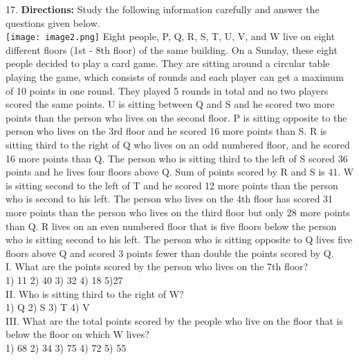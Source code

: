 \documentclass[
]{article}
\begin{document}
17. \textbf{Directions:} Study the following information carefully and answer the questions given
below.\\
\texttt{[image: image2.png]}
Eight people, P, Q, R, S, T, U, V, and W live on eight different floors (1st - 8th floor) of the
same building. On a Sunday, these eight people decided to play a card game. They are
sitting around a circular table playing the game, which consists of rounds and each player
can get a maximum of 10 points in one round. They played 5 rounds in total and no two
players scored the same points.
U is sitting between Q and S and he scored two more points than the person who lives on
the second floor. P is sitting opposite to the person who lives on the 3rd floor and he scored
16 more points than S. R is sitting third to the right of Q who lives on an odd numbered
floor, and he scored 16 more points than Q. The person who is sitting third to the left of S
scored 36 points and he lives four floors above Q. Sum of points scored by R and S is 41. W
is sitting second to the left of T and he scored 12 more points than the person who is second
to his left. The person who lives on the 4th floor has scored 31 more points than the person
who lives on the third floor but only 28 more points than Q. R lives on an even numbered
floor that is five floors below the person who is sitting second to his left. The person who is
sitting opposite to Q lives five floors above Q and scored 3 points fewer than double the
points scored by Q.\\

I. What are the points scored by the person who lives on the 7th floor?\\
1) 11 \hspace{2mm}2) 40 \hspace{2mm}3) 32 \hspace{2mm}4) 18 \hspace{2mm}5)27\\

II. Who is sitting third to the right of W?\\
1) Q \hspace{2mm}2) S \hspace{2mm}3) T \hspace{2mm}4) V\\

III. What are the total points scored by the people who live on the floor that is below the floor
on which W lives?\\
1) 68 \hspace{2mm}2) 34 \hspace{2mm}3) 75 \hspace{2mm}4) 72 \hspace{2mm}5) 55\\
\end{document}

